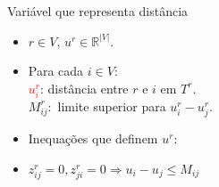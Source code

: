\documentclass[dvipsnames]{beamer}
\newcommand{\espacoUr}{\mathbb{R}^{|V|}}
\begin{document}
\begin{frame}{Variável que representa distância \hyperlink{sig_u}{}}
  \hypertarget{var_u}{}
  \begin{itemize}
  \item $r \in V$, $u^{r} \in \espacoUr$. \\
  \item Para cada $i \in V:$\\
    \textcolor{red}{$u^{r}_{i}$}: distância entre $r$ e $i$ em $T^{r}$.\\
    $M_{ij}^{r}:$ limite superior para $u^{r}_{i} - u^{r}_{j}$.
  \item Inequações que definem $u^r$:


{\tiny
  \begin{lpformulation}[]
  \end{lpformulation}    
  
  }

    
     
\item
  $z^r_{ij} = 0, z^r_{ji} = 0 \Rightarrow u_i - u_j \le M_{ij}$ 
  
  \end{itemize}

\end{frame}
\end{document}
